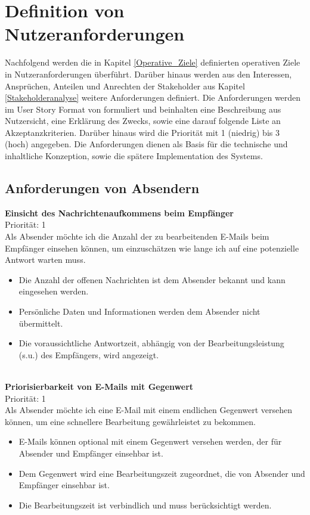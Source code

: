 
\chapter{Definition von Nutzeranforderungen}
\label{Definition_von_Nutzeranforderungen}

Nachfolgend werden die in Kapitel \ref{Operative_Ziele} definierten operativen Ziele in Nutzeranforderungen überführt. Darüber hinaus werden aus den Interessen, Ansprüchen, Anteilen und Anrechten der Stakeholder aus Kapitel \ref{Stakeholderanalyse} weitere Anforderungen definiert. Die Anforderungen werden im User Story Format von \cite{Cohn2004} formuliert und beinhalten eine Beschreibung aus Nutzersicht, eine Erklärung des Zwecks, sowie eine darauf folgende Liste an Akzeptanzkriterien. Darüber hinaus wird die Priorität mit 1 (niedrig) bis 3 (hoch) angegeben. Die Anforderungen dienen als Basis für die technische und inhaltliche Konzeption, sowie die spätere Implementation des Systems.



\section{Anforderungen von Absendern}

\textbf{Einsicht des Nachrichtenaufkommens beim Empfänger} \\
Priorität: 1 \\
Als Absender möchte ich die Anzahl der zu bearbeitenden E-Mails beim Empfänger einsehen können, um einzuschätzen wie lange ich auf eine potenzielle Antwort warten muss.
\begin{itemize}
    \item Die Anzahl der offenen Nachrichten ist dem Absender bekannt und kann eingesehen werden.
    \item Persönliche Daten und Informationen werden dem Absender nicht übermittelt.
    \item Die voraussichtliche Antwortzeit, abhängig von der Bearbeitungsleistung (s.u.) des Empfängers, wird angezeigt.
\end{itemize}

\noindent
\\ \textbf{Priorisierbarkeit von E-Mails mit Gegenwert} \\
Priorität: 1 \\
Als Absender möchte ich eine E-Mail mit einem endlichen Gegenwert versehen können, um eine schnellere Bearbeitung gewährleistet zu bekommen.
\begin{itemize}
    \item E-Mails können optional mit einem Gegenwert versehen werden, der für Absender und Empfänger einsehbar ist.
    \item Dem Gegenwert wird eine Bearbeitungszeit zugeordnet, die von Absender und Empfänger einsehbar ist.
    \item Die Bearbeitungszeit ist verbindlich und muss berücksichtigt werden.
\end{itemize}

